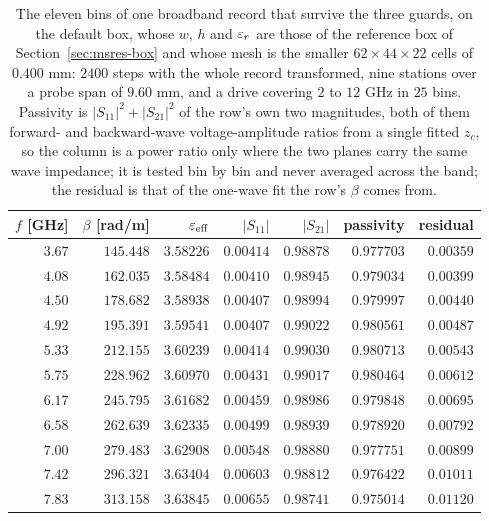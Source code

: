 \begin{table}[H]
  \centering
  \caption{The eleven bins of one broadband record that survive the three guards, on the default box, whose $w$,
  $h$ and $\varepsilon_r$ are those of the reference box of Section~\ref{sec:msres-box} and whose mesh is the smaller
  $62\times44\times22$ cells of $0.400$ mm: $2400$ steps with the whole record transformed, nine stations over a probe span of $9.60$ mm, and a
  drive covering $2$ to $12$ GHz in $25$ bins. Passivity is $|S_{11}|^2+|S_{21}|^2$ of the row's own two
  magnitudes, both of them forward- and backward-wave voltage-amplitude ratios from a single fitted $z_c$, so the column is a power ratio only where the two planes carry the same wave impedance; it is tested bin by bin and never averaged across the band; the residual is that of the one-wave fit the
  row's $\beta$ comes from.}
  \label{tab:ms-broadband}
  \small
  \begin{tabular}{@{}rrrrrrr@{}}
    \toprule
    $f$ [GHz] & $\beta$ [rad/m] & $\varepsilon_{\mathrm{eff}}$ & $|S_{11}|$ & $|S_{21}|$ & passivity & residual \\
    \midrule
    $3.67$ & $145.448$ & $3.58226$ & $0.00414$ & $0.98878$ & $0.977703$ & $0.00359$ \\
    $4.08$ & $162.035$ & $3.58484$ & $0.00410$ & $0.98945$ & $0.979034$ & $0.00399$ \\
    $4.50$ & $178.682$ & $3.58938$ & $0.00407$ & $0.98994$ & $0.979997$ & $0.00440$ \\
    $4.92$ & $195.391$ & $3.59541$ & $0.00407$ & $0.99022$ & $0.980561$ & $0.00487$ \\
    $5.33$ & $212.155$ & $3.60239$ & $0.00414$ & $0.99030$ & $0.980713$ & $0.00543$ \\
    $5.75$ & $228.962$ & $3.60970$ & $0.00431$ & $0.99017$ & $0.980464$ & $0.00612$ \\
    $6.17$ & $245.795$ & $3.61682$ & $0.00459$ & $0.98986$ & $0.979848$ & $0.00695$ \\
    $6.58$ & $262.639$ & $3.62335$ & $0.00499$ & $0.98939$ & $0.978920$ & $0.00792$ \\
    $7.00$ & $279.483$ & $3.62908$ & $0.00548$ & $0.98880$ & $0.977751$ & $0.00899$ \\
    $7.42$ & $296.321$ & $3.63404$ & $0.00603$ & $0.98812$ & $0.976422$ & $0.01011$ \\
    $7.83$ & $313.158$ & $3.63845$ & $0.00655$ & $0.98741$ & $0.975014$ & $0.01120$ \\
    \bottomrule
  \end{tabular}
\end{table}

